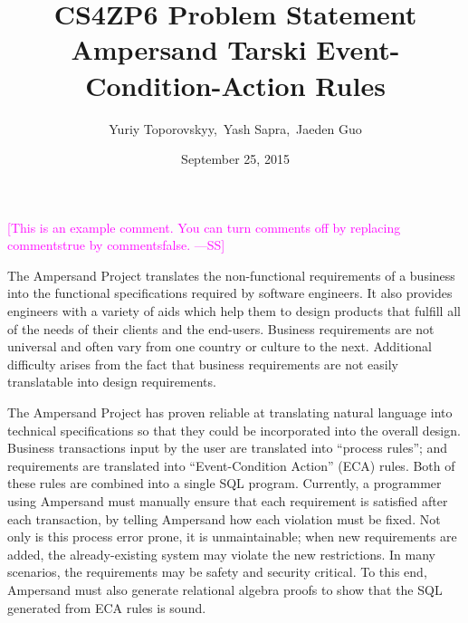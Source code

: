 \documentclass[12pt]{article}
\newcommand{\authornote}[3]{\textcolor{#1}{[#3 ---#2]}}
\newcommand{\authornote}[3]{}
\newcommand{\wss}[1]{\authornote{magenta}{SS}{#1}}
\begin{document}
\title{CS4ZP6 Problem Statement \\ Ampersand Tarski Event-Condition-Action Rules } 
\author{Yuriy Toporovskyy,\ Yash Sapra,\ Jaeden Guo}
\date{September 25, 2015}
\thispagestyle{empty}
\maketitle
\wss{This is an example comment.  You can turn comments off by replacing
		commentstrue by commentsfalse.}
%
%
%

%

The Ampersand Project translates the non-functional requirements of a
business into the functional specifications required by software engineers. It
also provides engineers with a variety of aids which help them to design
products that fulfill all of the needs of their clients and the end-users.
%
%
Business requirements are not universal and often vary from one country or
culture to the next. Additional difficulty arises from the fact that business
requirements are not easily translatable into design requirements.

The Ampersand Project has proven reliable at translating natural
language into technical specifications so that they could be incorporated into
the overall design. Business transactions input by the user are translated into
``process rules''; and requirements are translated into ``Event-Condition
Action'' (ECA) rules. Both of these rules are combined into a single SQL
program. Currently, a programmer using Ampersand must manually ensure that each
requirement is satisfied after each transaction, by telling Ampersand how each
violation must be fixed. Not only is this process error prone, it is
unmaintainable; when new requirements are added, the already-existing system may
violate the new restrictions. In many scenarios, the requirements may be safety
and security critical. To this end, Ampersand must also generate relational
algebra proofs to show that the SQL generated from ECA rules is sound. 
\end{document}
